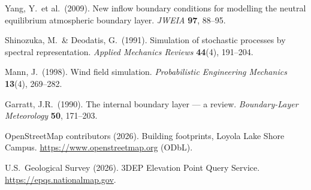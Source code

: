 \documentclass[11pt,letterpaper]{article}
\begin{document}
\begin{description}[font=\normalfont\itshape,leftmargin=1em]
  \item Yang, Y.\ et al.\ (2009). New inflow boundary conditions for modelling the neutral equilibrium atmospheric boundary layer. \emph{JWEIA} \textbf{97}, 88--95.
  \item Shinozuka, M.\ \& Deodatis, G.\ (1991). Simulation of stochastic processes by spectral representation. \emph{Applied Mechanics Reviews} \textbf{44}(4), 191--204.
  \item Mann, J.\ (1998). Wind field simulation. \emph{Probabilistic Engineering Mechanics} \textbf{13}(4), 269--282.
  \item Garratt, J.R.\ (1990). The internal boundary layer --- a review. \emph{Boundary-Layer Meteorology} \textbf{50}, 171--203.
  \item OpenStreetMap contributors (2026). Building footprints, Loyola Lake Shore Campus. \url{https://www.openstreetmap.org} (ODbL).
  \item U.S.\ Geological Survey (2026). 3DEP Elevation Point Query Service. \url{https://epqs.nationalmap.gov}.
\end{description}
\end{document}
